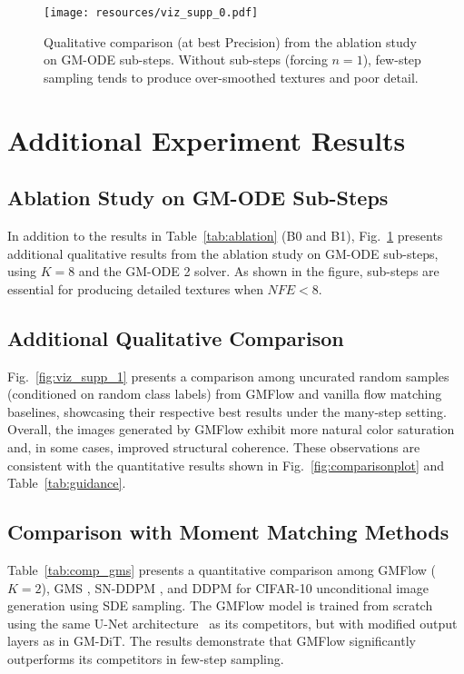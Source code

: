 \documentclass{article}
\theoremstyle{custom}
\theoremstyle{definition}
\theoremstyle{remark}
\begin{document}
\begin{figure}[t]
\begin{center}
\texttt{[image: resources/viz\_supp\_0.pdf]}
\caption{Qualitative comparison (at best Precision) from the ablation study on GM-ODE sub-steps. Without sub-steps (forcing $n=1$), few-step sampling tends to produce over-smoothed textures and poor detail.
}
\label{fig:viz_supp_0}
\end{center}
\end{figure}

\section{Additional Experiment Results}

\subsection{Ablation Study on GM-ODE Sub-Steps}

In addition to the results in Table~\ref{tab:ablation} (B0 and B1), Fig.~\ref{fig:viz_supp_0} presents additional qualitative results from the ablation study on GM-ODE sub-steps, using $K=8$ and the GM-ODE 2 solver. As shown in the figure, sub-steps are essential for producing detailed textures when $\mathit{NFE} < 8$.

\subsection{Additional Qualitative Comparison}

Fig.~\ref{fig:viz_supp_1} presents a comparison among uncurated random samples (conditioned on random class labels) from GMFlow and vanilla flow matching baselines, showcasing their respective best results under the many-step setting. Overall, the images generated by GMFlow exhibit more natural color saturation and, in some cases, improved structural coherence. These observations are consistent with the quantitative results shown in Fig.~\ref{fig:comparisonplot} and Table~\ref{tab:guidance}.

\subsection{Comparison with Moment Matching Methods}
\label{sec:compare_moment}

Table~\ref{tab:comp_gms} presents a quantitative comparison among GMFlow ($K=2$), GMS \cite{gms}, SN-DDPM \cite{bao2022estimating}, and DDPM \cite{ddpm} for CIFAR-10 \cite{krizhevsky2009learning} unconditional image generation using SDE sampling. The GMFlow model is trained from scratch using the same U-Net architecture~\cite{unet, ddpm} as its competitors, but with modified output layers as in GM-DiT. The results demonstrate that GMFlow significantly outperforms its competitors in few-step sampling.
\end{document}
